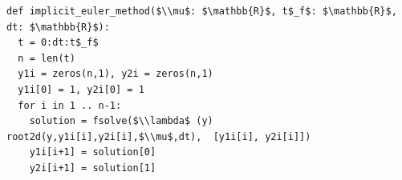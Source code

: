 \documentclass[border=10pt]{standalone}
\begin{document}
\begin{lstlisting}
def implicit_euler_method($\\mu$: $\mathbb{R}$, t$_f$: $\mathbb{R}$, dt: $\mathbb{R}$):
  t = 0:dt:t$_f$
  n = len(t)
  y1i = zeros(n,1), y2i = zeros(n,1)
  y1i[0] = 1, y2i[0] = 1
  for i in 1 .. n-1:
    solution = fsolve($\\lambda$ (y) root2d(y,y1i[i],y2i[i],$\\mu$,dt),  [y1i[i], y2i[i]])
    y1i[i+1] = solution[0]
    y2i[i+1] = solution[1]
\end{lstlisting}
\end{document}
